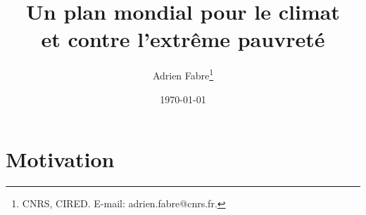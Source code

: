 \documentclass[a5paper,french,openany]{memoir}
\title{Un plan mondial pour le climat \\et contre l'extrême pauvreté}
\author{Adrien Fabre\footnote{CNRS, CIRED. E-mail: adrien.fabre@cnrs.fr.}}
\date{\today}
\begin{document}
\maketitle

\clearpage
\tableofcontents


\chapter*{Motivation}\label{ch:intro}

\end{document}

